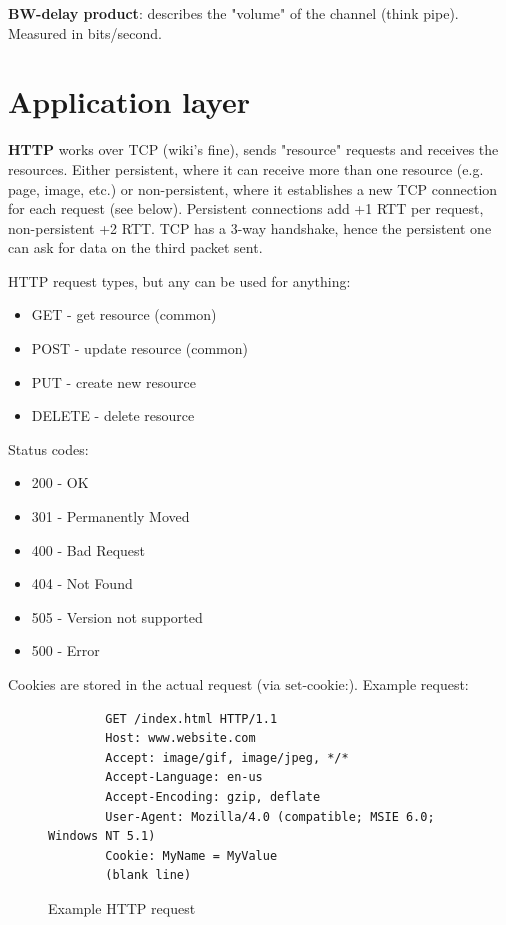 \documentclass{article}
\begin{document}
\textbf{BW-delay product}: describes the "volume" of the channel (think pipe). Measured in bits/second.

\section{Application layer}
\textbf{HTTP} works over TCP (wiki's fine), sends "resource" requests and receives the resources. Either persistent, where it can receive more than one resource (e.g. page, image, etc.) or non-persistent, where it establishes a new TCP connection for each request (see below). Persistent connections add +1 RTT per request, non-persistent +2 RTT. TCP has a 3-way handshake, hence the persistent one can ask for data on the third packet sent.

HTTP request types, but any can be used for anything:
\begin{itemize}
    \item GET - get resource (common)
    \item POST - update resource (common)
    \item PUT - create new resource 
    \item DELETE - delete resource
\end{itemize}

Status codes:
\begin{itemize}
    \item 200 - OK
    \item 301 - Permanently Moved
    \item 400 - Bad Request
    \item 404 - Not Found
    \item 505 - Version not supported
    \item 500 - Error
\end{itemize}

Cookies are stored in the actual request (via $\text{set-cookie:}$). Example request:

\begin{figure}
    \begin{verbatim}
        GET /index.html HTTP/1.1
        Host: www.website.com
        Accept: image/gif, image/jpeg, */*
        Accept-Language: en-us
        Accept-Encoding: gzip, deflate
        User-Agent: Mozilla/4.0 (compatible; MSIE 6.0; Windows NT 5.1)
        Cookie: MyName = MyValue
        (blank line)
    \end{verbatim}
    \label{fig:http}
    \caption{Example HTTP request}
\end{figure}
\end{document}
